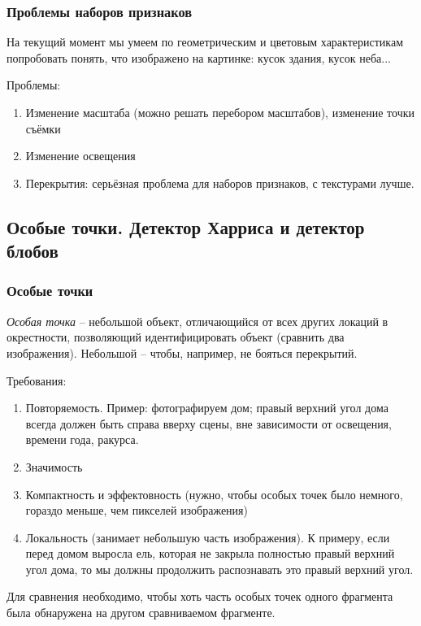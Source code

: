 \documentclass[main.tex]{subfiles}
\begin{document}
\subsubsection{Проблемы наборов признаков}

На текущий момент мы умеем по геометрическим и цветовым характеристикам попробовать понять, что изображено на картинке: кусок здания, кусок неба...

Проблемы:
\begin{enumerate}[noitemsep]
	\item Изменение масштаба (можно решать перебором масштабов), изменение точки съёмки
	\item Изменение освещения
	\item Перекрытия: серьёзная проблема для наборов признаков, с текстурами лучше.
\end{enumerate}

\subsection{Особые точки. Детектор Харриса и детектор блобов}
\subsubsection{Особые точки}

\emph{Особая точка} -- небольшой объект, отличающийся от всех других локаций в окрестности, позволяющий идентифицировать объект (сравнить два изображения).
Небольшой -- чтобы, например, не бояться перекрытий.

Требования:

\begin{enumerate}[noitemsep]
	\item Повторяемость. Пример: фотографируем дом; правый верхний угол дома всегда должен быть справа вверху сцены, вне зависимости от освещения, времени года, ракурса.
	\item Значимость
	\item Компактность и эффектовность (нужно, чтобы особых точек было немного, гораздо меньше, чем пикселей изображения)
	\item Локальность (занимает небольшую часть изображения).
	К примеру, если перед домом выросла ель, которая не закрыла полностью правый верхний угол дома, то мы должны продолжить распознавать это правый верхний угол.
\end{enumerate}

Для сравнения необходимо, чтобы хоть часть особых точек одного фрагмента была обнаружена на другом сравниваемом фрагменте.
\end{document}
